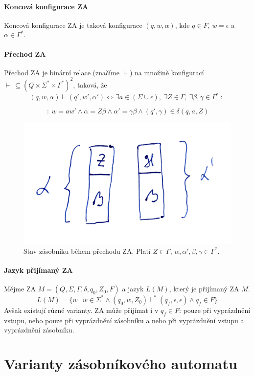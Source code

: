\paragraph{Koncová konfigurace ZA} Koncová konfigurace ZA je taková konfigurace $(q, w, \alpha)$, kde $q \in F$, $w = \epsilon$ a $\alpha \in \Gamma^*$.

\paragraph{Přechod ZA} Přechod ZA je binární relace (značíme $\vdash$) na množině konfigurací $\vdash ~ \subseteq (Q \times \Sigma^* \times \Gamma^*)^2$, taková, že $$ (q, w, \alpha) \vdash (q', w', \alpha') \Leftrightarrow \exists a \in (\Sigma \cup \epsilon), ~ \exists Z \in \Gamma, ~ \exists \beta, \gamma \in \Gamma^* ~:~ $$

$$ ~:~ w = aw' \land \alpha = Z \beta \land \alpha' = \gamma \beta \land (q', \gamma) \in \delta(q, a, Z) $$

\begin{figure}[H]
    \centering
    \includegraphics[width=0.35\linewidth]{za_prechod_zasobnik.pdf}
    \caption{Stav zásobníku během přechodu ZA. Platí $Z \in \Gamma,~ \alpha, \alpha', \beta, \gamma \in \Gamma^*$.}
\end{figure}

\paragraph{Jazyk přijímaný ZA} Mějme ZA $M = (Q, \Sigma, \Gamma, \delta, q_0, Z_0, F)$ a jazyk $L(M)$, který je přijímaný ZA $M$. $$ L(M) = \{ w ~|~ w \in \Sigma^* \land (q_0, w, Z_0) \vdash^* (q_f, \epsilon, \epsilon) \land q_f \in F \}$$ Avšak existují různé varianty. ZA může přijímat i v $q_f \in F$: pouze při vyprázdnění vstupu, nebo pouze při vyprázdnění zásobníku a nebo při vyprázdnění vstupu a vyprázdnění zásobníku.


\section{Varianty zásobníkového automatu}

